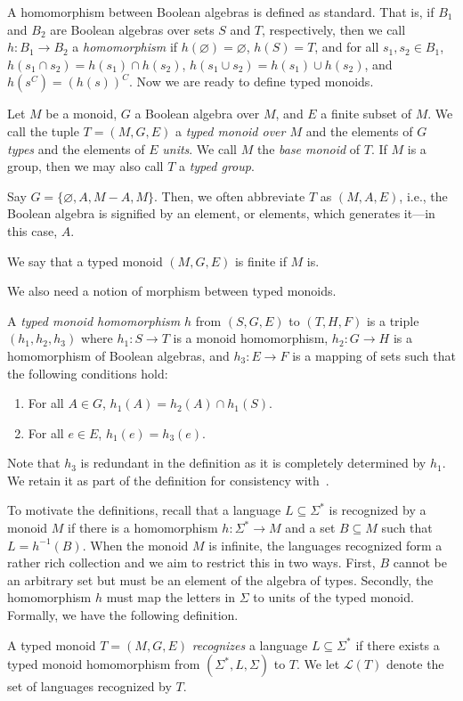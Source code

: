 \documentclass[a4paper,UKenglish,cleveref, autoref, thm-restate, anonymous]{lipics-v2021}
\begin{document}
A homomorphism between Boolean algebras is defined as standard.  That is, if $B_1$ and $B_2$ are Boolean algebras over sets $S$ and $T$, respectively, then we call $h : B_1 \rightarrow B_2$ a \emph{homomorphism} if $h(\varnothing) = \varnothing$, $h(S) = T$, and for all $s_1, s_2 \in B_1$, $h(s_1 \cap s_2) = h(s_1) \cap h(s_2)$, $h(s_1 \cup s_2) = h(s_1) \cup h(s_2)$, and $h(s^C) = (h(s))^C$.
Now we are ready to define typed monoids.

\begin{definition}
    Let $M$ be a monoid, $G$ a Boolean algebra over $M$, and $E$ a finite subset of $M$. We call the tuple $T = (M, G, E)$ a \emph{typed monoid over $M$} and the elements of $G$ \emph{types} and the elements of $E$ \emph{units}. We call $M$ the \emph{base monoid} of $T$. If $M$ is a group, then we may also call $T$ a \emph{typed group}.

    Say $G = \{\varnothing, A, M - A, M\}$. Then, we often abbreviate $T$ as $(M, A, E)$, i.e., the Boolean algebra is signified by an element, or elements, which generates it---in this case, $A$. 
\end{definition}
We say that a typed monoid $(M,G,E)$ is finite if $M$ is.

We also need a notion of morphism between typed monoids.
\begin{definition}\label{def:typedhom}
    A \emph{typed monoid homomorphism} $h$ from $(S, G, E)$ to  $(T, H, F)$ is a triple $(h_1, h_2, h_3)$ where $h_1 : S \rightarrow T$ is a monoid homomorphism, $h_2 : G \rightarrow H$ is a homomorphism of Boolean algebras, and $h_3 : E \rightarrow F$ is a mapping of sets such that the following conditions hold:
    \begin{enumerate}[\ \ \ \ (i)]
        \item For all $A \in G$, $h_1(A) = h_2(A) \cap h_1(S)$.
        \item For all $e \in E$, $h_1(e) = h_3(e)$.
    \end{enumerate}
\end{definition}
Note that $h_3$ is redundant in the definition as it is completely determined by $h_1$.  We retain it as part of the definition for consistency with~\cite{behle2011typed,krebs2008typed}.

To motivate the definitions, recall that a language $L \subseteq \Sigma^*$ is recognized by a monoid $M$ if there is a homomorphism $h: \Sigma^* \rightarrow M$ and a set $B \subseteq M$ such that $L = h^{-1}(B)$.  When the monoid $M$ is infinite, the languages recognized form a rather rich collection and we aim to restrict this in two ways.  First, $B$ cannot be an arbitrary set but must be an element of the algebra of types.  Secondly, the homomorphism $h$ must map the letters in $\Sigma$ to units of the typed monoid.  Formally, we have the following definition.
\begin{definition}\label{def:langrecognitiontyped}
    A typed monoid $T = (M, G, E)$ \emph{recognizes} a language $L \subseteq \Sigma^*$ if there exists a typed monoid homomorphism from $(\Sigma^*, L, \Sigma)$ to $T$. We let $\mathcal{L}(T)$ denote the set of languages recognized by $T$.
\end{definition}
\end{document}
